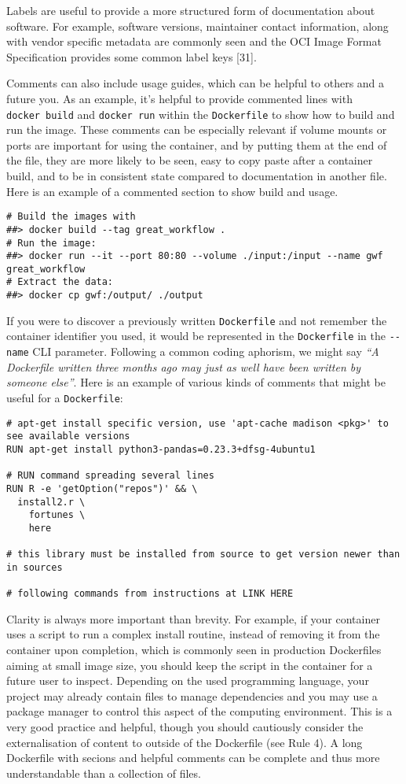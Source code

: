 \documentclass[10pt,letterpaper]{article}
\begin{document}
Labels are useful to provide a more structured form of documentation
about software. For example, software versions, maintainer contact
information, along with vendor specific metadata are commonly seen and
the OCI Image Format Specification provides some common label keys
{[}31{]}.

Comments can also include usage guides, which can be helpful to others
and a future you. As an example, it's helpful to provide commented lines
with \texttt{docker\ build} and \texttt{docker\ run} within the
\texttt{Dockerfile} to show how to build and run the image. These
comments can be especially relevant if volume mounts or ports are
important for using the container, and by putting them at the end of the
file, they are more likely to be seen, easy to copy paste after a
container build, and to be in consistent state compared to documentation
in another file. Here is an example of a commented section to show build
and usage.

\begin{verbatim}
# Build the images with
##> docker build --tag great_workflow .
# Run the image:
##> docker run --it --port 80:80 --volume ./input:/input --name gwf great_workflow
# Extract the data:
##> docker cp gwf:/output/ ./output
\end{verbatim}

If you were to discover a previously written \texttt{Dockerfile} and not
remember the container identifier you used, it would be represented in
the \texttt{Dockerfile} in the \texttt{-\/-name} CLI parameter.
Following a common coding aphorism, we might say \emph{``A Dockerfile
written three months ago may just as well have been written by someone
else''}. Here is an example of various kinds of comments that might be
useful for a \texttt{Dockerfile}:

\begin{verbatim}
# apt-get install specific version, use 'apt-cache madison <pkg>' to see available versions
RUN apt-get install python3-pandas=0.23.3+dfsg-4ubuntu1

# RUN command spreading several lines
RUN R -e 'getOption("repos")' && \
  install2.r \
    fortunes \
    here

# this library must be installed from source to get version newer than in sources

# following commands from instructions at LINK HERE
\end{verbatim}

Clarity is always more important than brevity. For example, if your
container uses a script to run a complex install routine, instead of
removing it from the container upon completion, which is commonly seen
in production Dockerfiles aiming at small image size, you should keep
the script in the container for a future user to inspect. Depending on
the used programming language, your project may already contain files to
manage dependencies and you may use a package manager to control this
aspect of the computing environment. This is a very good practice and
helpful, though you should cautiously consider the externalisation of
content to outside of the Dockerfile (see Rule 4). A long Dockerfile
with secions and helpful comments can be complete and thus more
understandable than a collection of files.
\end{document}
